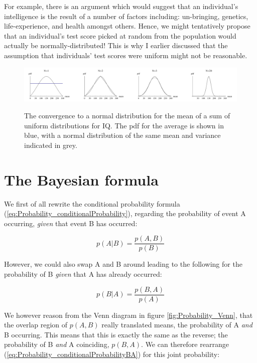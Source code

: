 \documentclass[11pt,fullpage]{book}
\begin{document}
For example, there is an argument which would suggest that an individual's intelligence is the result of a number of factors including: un-bringing, genetics, life-experience, and health amongst others. Hence, we might tentatively propose that an individual's test score picked at random from the population would actually be normally-distributed! This is why I earlier discussed that the assumption that individuals' test scores were uniform might not be reasonable.

\begin{figure}
\centering
\scalebox{0.4} 
{\includegraphics{Probability_CLTNormalSum.pdf}}
\caption{The convergence to a normal distribution for the mean of a sum of uniform distributions for IQ. The pdf for the average is shown in blue, with a normal distribution of the same mean and variance indicated in grey.}\label{fig:Probability_CLTNormalSum}
\end{figure}

\section{The Bayesian formula}\label{sec:Probability_BayesianFormula}
We first of all rewrite the conditional probability formula (\ref{eq:Probability_conditionalProbability}), regarding the probability of event A occurring, \textit{given} that event B has occurred:

\begin{equation}\label{eq:Probability_conditionalProbabilityAB}
p(A|B) = \frac{p(A,B)}{p(B)}
\end{equation}

However, we could also swap A and B around leading to the following for the probability of B \textit{given} that A has already occurred:

\begin{equation}\label{eq:Probability_conditionalProbabilityBA}
p(B|A) = \frac{p(B,A)}{p(A)}
\end{equation}

We however reason from the Venn diagram in figure \ref{fig:Probability_Venn}, that the overlap region of $p(A,B)$ really translated means, the probability of A \textit{and} B occurring. This means that this is exactly the same as the reverse; the probability of B \textit{and} A coinciding, $p(B,A)$. We can therefore rearrange (\ref{eq:Probability_conditionalProbabilityBA}) for this joint probability:
\end{document}
